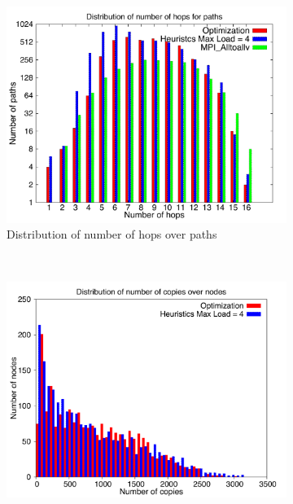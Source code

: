 \begin{figure}[!htbp]
        \centering
        \begin{subfigure}[b]{0.49\textwidth}
                \includegraphics[width=\textwidth]{report_figures/constantr/87_4096/hop_histo.pdf}
                \caption{Distribution of number of hops over paths}
                \label{fig:87_4096_hop}
        \end{subfigure}%
        ~ %
        \begin{subfigure}[b]{0.49\textwidth}
                \includegraphics[width=\textwidth]{report_figures/constantr/87_4096/copy_histo.pdf}

\end{subfigure}
\end{figure}
